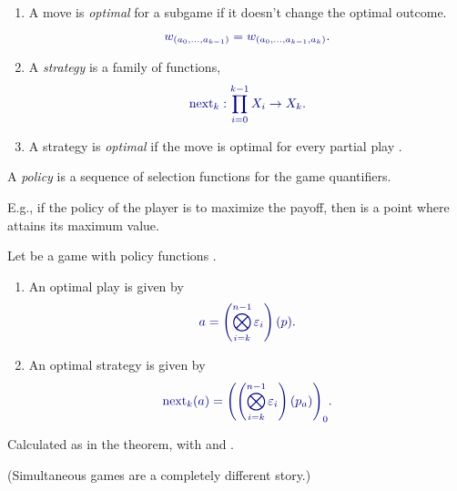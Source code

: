 \documentclass%
[%
Screen4to3,
]{foils}
\newcommand{\next}{\operatorname{next}}
\begin{document}
\begin{enumerate}
\item A move  is \emph{optimal} for a subgame
   if it
  doesn't change the optimal outcome.

\[  \darkblue{w_{ (a_0,\dots,a_{k-1}) } = w_{ (a_0,\dots,a_{k-1},a_k)}}. \]

\item A \emph{strategy} is a family of functions,
%
\[\darkblue{\next_k : \prod_{i=0}^{k-1} X_i \to X_k.} \]

\item A strategy is \emph{optimal} if the move \darkblue{$\next_k(a)$}
  is optimal for every partial play .

\end{enumerate}


\noindent 
A \emph{policy} is a sequence of
selection functions  for the game quantifiers.

\vfill

\noindent
E.g., if the policy of the player is to maximize the payoff, then
 is a point where  attains
its maximum value.




\noindent{} 
Let  be a game with policy functions
.
\begin{enumerate}
\item[\grey{1.}] 
An optimal play is given by
\[
\darkblue{{a} = \left(\bigotimes_{i=k}^{n-1}  \varepsilon_i\right)(p)}.
\]


\item[\grey{2.}] 
An optimal strategy is given by
\[
\darkblue{\next_k({a}) = \left(\left(\bigotimes_{i=k}^{n-1} \varepsilon_i\right)(p_{a})\right)_0}.
\]
\end{enumerate}


Calculated as in the theorem, with  and .


\vfill

(Simultaneous games are a completely different story.)
\end{document}

